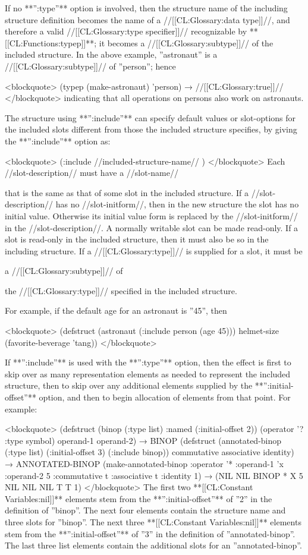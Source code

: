 If no **'':type''** option is involved, then the structure name of the including structure definition becomes the name of a //[[CL:Glossary:data type]]//, and therefore a valid //[[CL:Glossary:type specifier]]// recognizable by **[[CL:Functions:typep]]**; it becomes a //[[CL:Glossary:subtype]]// of the included structure. In the above example, ''astronaut'' is a //[[CL:Glossary:subtype]]// of ''person''; hence

<blockquote> (typep (make-astronaut) 'person) → //[[CL:Glossary:true]]// </blockquote> indicating that all operations on persons also work on astronauts.

The structure using **'':include''** can specify default values or slot-options for the included slots different from those the included structure specifies, by giving the **'':include''** option as:

<blockquote> (:include //included-structure-name// ) </blockquote> Each //slot-description// must have a //slot-name//

that is the same as that of some slot in the included structure. If a //slot-description// has no //slot-initform//, then in the new structure the slot has no initial value. Otherwise its initial value form is replaced by the //slot-initform// in the //slot-description//. A normally writable slot can be made read-only. If a slot is read-only in the included structure, then it must also be so in the including structure. If a //[[CL:Glossary:type]]// is supplied for a slot, it must be

a //[[CL:Glossary:subtype]]// of

the //[[CL:Glossary:type]]// specified in the included structure.

For example, if the default age for an astronaut is ''45'', then

<blockquote> (defstruct (astronaut (:include person (age 45))) helmet-size (favorite-beverage 'tang)) </blockquote>

If **'':include''** is used with the **'':type''** option, then the effect is first to skip over as many representation elements as needed to represent the included structure, then to skip over any additional elements supplied by the **'':initial-offset''** option, and then to begin allocation of elements from that point. For example:

<blockquote> (defstruct (binop (:type list) :named (:initial-offset 2)) (operator '? :type symbol) operand-1 operand-2) → BINOP (defstruct (annotated-binop (:type list) (:initial-offset 3) (:include binop)) commutative associative identity) → ANNOTATED-BINOP (make-annotated-binop :operator '* :operand-1 'x :operand-2 5 :commutative t :associative t :identity 1) → (NIL NIL BINOP * X 5 NIL NIL NIL T T 1) </blockquote> The first two **[[CL:Constant Variables:nil]]** elements stem from the **'':initial-offset''** of ''2'' in the definition of ''binop''. The next four elements contain the structure name and three slots for ''binop''. The next three **[[CL:Constant Variables:nil]]** elements stem from the **'':initial-offset''** of ''3'' in the definition of ''annotated-binop''. The last three list elements contain the additional slots for an ''annotated-binop''.

